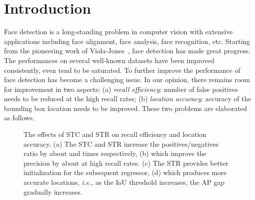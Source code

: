 \documentclass[letterpaper]{article} \usepackage{aaai19m}  \usepackage{times}  \usepackage{helvet}  \usepackage{courier}  \usepackage{url}  \usepackage{graphicx}  \usepackage{subfigure}
\def\ie{{\em i.e.}}
\begin{document}
\section{Introduction}
Face detection is a long-standing problem in computer
vision with extensive applications including face alignment, face analysis, face recognition, etc. Starting from the pioneering work of Viola-Jones~\cite{DBLP:journals/ijcv/ViolaJ04}, face detection has made great progress. The performances on several well-known datasets have been improved consistently, even tend to be saturated. To further improve the performance of face detection has become a challenging issue. In our opinion, there remains room for improvement in two aspects: (a) \emph{recall efficiency}: number of false positives needs to be reduced at the high recall rates; (b) \emph{location accuracy}: accuracy of the bounding box location needs to be improved. These two problems are elaborated as follows.


\begin{figure}[t]
\centering
{}
\vspace{-3.0mm}
\caption{The effects of STC and STR on recall efficiency and location accuracy. (a) The STC and STR increase the positives/negatives ratio by about  and  times respectively, (b) which improve the precision by about  at high recall rates. (c) The STR provides better initialization for the subsequent regressor, (d) which produces more accurate locations, \ie, as the IoU threshold increases, the AP gap gradually increases.}
\vspace{-4.0mm}
\label{fig:effect-stc-str} \end{figure}
\end{document}

